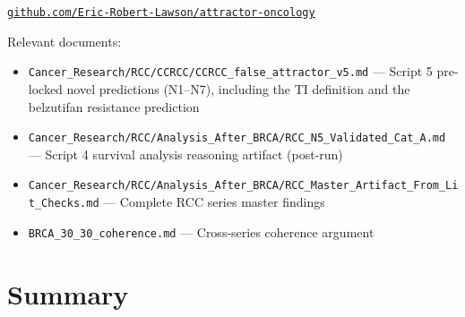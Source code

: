 \documentclass[11pt, a4paper]{article}
\begin{document}
\begin{center}
\href{https://github.com/Eric-Robert-Lawson/attractor-oncology}
{\texttt{github.com/Eric-Robert-Lawson/attractor-oncology}}
\end{center}

Relevant documents:
\begin{itemize}[noitemsep]
    \item \texttt{Cancer\_Research/RCC/CCRCC/CCRCC\_false\_attractor\_v5.md}
    --- Script 5 pre-locked novel predictions
    (N1--N7), including the TI definition
    and the belzutifan resistance prediction
    \item \texttt{Cancer\_Research/RCC/Analysis\_After\_BRCA/RCC\_N5\_Validated\_Cat\_A.md}
    --- Script 4 survival analysis reasoning
    artifact (post-run)
    \item \texttt{Cancer\_Research/RCC/Analysis\_After\_BRCA/RCC\_Master\_Artifact\_From\_Lit\_Checks.md}
    --- Complete RCC series master findings
    \item \texttt{BRCA\_30\_30\_coherence.md}
    --- Cross-series coherence argument
\end{itemize}

\section{Summary}
\label{sec:summary}
\end{document}

